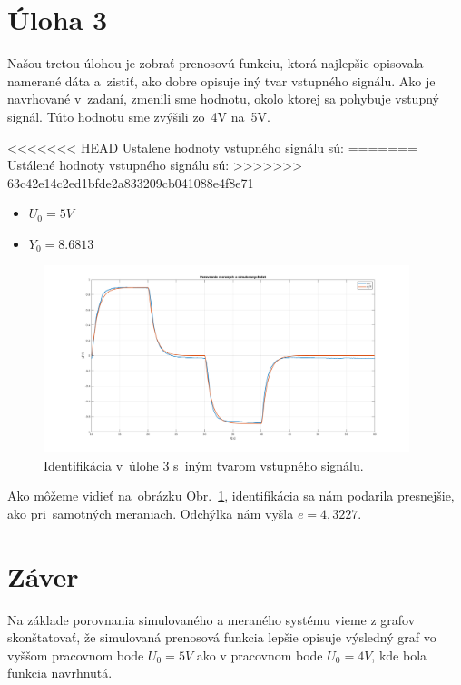 \documentclass{article}
\begin{document}
\section{Úloha 3}
\label{subsec:U3}

Našou tretou úlohou je zobrať prenosovú funkciu, ktorá najlepšie opisovala namerané dáta a~zistiť, ako dobre opisuje
iný tvar vstupného signálu. Ako je navrhované v~zadaní, zmenili sme hodnotu, okolo ktorej sa pohybuje vstupný signál.
Túto hodnotu sme zvýšili zo~4V na~5V.

<<<<<<< HEAD
Ustalene hodnoty vstupného signálu sú:
=======
Ustálené hodnoty vstupného signálu sú:
>>>>>>> 63c42e14c2ed1bfde2a833209cb041088e4f8e71
\begin{itemize}
	\item $U_0 = 5V$
	\item $Y_0 = 8.6813$
\end{itemize}

\begin{figure}[!htbp]
	\begin{center}
		\includegraphics[width=0.95\textwidth]{include/uloha3.png}
	\end{center}
	\caption{Identifikácia v~úlohe 3 s~iným tvarom vstupného signálu.}
	\label{fig:u3}
\end{figure}

Ako môžeme vidieť na~obrázku Obr.~\ref{fig:u3}, identifikácia sa nám podarila presnejšie, ako pri~samotných meraniach.
Odchýlka nám vyšla $e = 4,3227$.

\clearpage

\section{Záver}
\label{sec:zaver}

Na základe porovnania simulovaného a meraného systému vieme z grafov skonštatovať, že simulovaná prenosová funkcia
lepšie opisuje výsledný graf vo vyššom pracovnom bode $U_0 = 5V$ ako v pracovnom bode $U_0 = 4V$, kde bola funkcia
navrhnutá.
\end{document}
